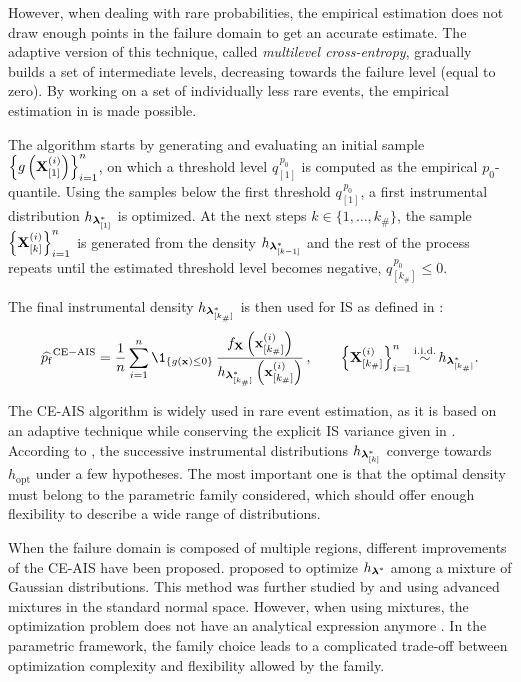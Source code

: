 However, when dealing with rare probabilities, the empirical estimation does not draw enough points in the failure domain to get an accurate estimate. 
The adaptive version of this technique, called \textit{multilevel cross-entropy}, gradually builds a set of intermediate levels, decreasing towards the failure level (equal to zero). 
By working on a set of individually less rare events, the empirical estimation in  is made possible. 

The algorithm starts by generating and evaluating an initial sample $\left\{g\left({\bf X}_{[1]}^{(i)}\right)\right\}_{i=1}^n$, on which a threshold level $q_{[1]}^{\, p_0}$ is computed as the empirical $p_0$-quantile. 
Using the samples below the first threshold $q_{[1]}^{\, p_0}$, a first instrumental distribution $h_{{\boldsymbol{\lambda}}^*_{[1]}}$ is optimized.  
At the next steps $k\in \{1, \dots, k_\# \}$, the sample $\left\{{\bf X}_{[k]}^{(i)}\right\}_{i=1}^n$ is generated from the density $h_{{\boldsymbol{\lambda}}^*_{[k-1]}}$ and the rest of the process repeats until the estimated threshold level becomes negative, $q_{[k_\#]}^{\, p_0} \leq 0$. 

The final instrumental density $h_{{\boldsymbol{\lambda}}^*_{[k_{\#}]}}$ is then used for IS as defined in : 
\begin{equation}
    \what{\pf}^{\mathrm{CE-AIS}} = \frac1n \sum_{i=1}^{n} \1_{\{g(\bx) \leq 0\}} \,
                                                 \frac{f_\bX\left(\bx^{(i)}_{[k_{\#}]}\right)}{ h_{\blambda^*_{[k_{\#}]}}\left(\bx^{(i)}_{[k_{\#}]}\right)}\, , \qquad
                                                 \left\{\bX_{[k_{\#}]}^{(i)}\right\}_{i=1}^n \simiid h_{\blambda^*_{[k_{\#}]}}.
\end{equation}

The CE-AIS algorithm is widely used in rare event estimation, as it is based on an adaptive technique while conserving the explicit IS variance given in .  
According to \citet{rubinstein_2004_CE}, the successive instrumental distributions $h_{{\boldsymbol{\lambda}}^*_{[k]}}$ converge towards $h_{\mathrm{opt}}$ under a few hypotheses. 
The most important one is that the optimal density must belong to the parametric family considered, which should offer enough flexibility to describe a wide range of distributions. 

When the failure domain is composed of multiple regions, different improvements of the CE-AIS have been proposed. 
\citet{kurtz_song_2013_aisce} proposed to optimize $h_{{\boldsymbol{\lambda}}^*}$ among a mixture of Gaussian distributions. 
This method was further studied by \citet{wang_2016_aisce} and \citet{papaioannou_2019_aisce} using advanced mixtures in the standard normal space.
However, when using mixtures, the optimization problem does not have an analytical expression anymore \citep{geyer_2019_aisce}.   
In the parametric framework, the family choice leads to a complicated trade-off between optimization complexity and flexibility allowed by the family. 

